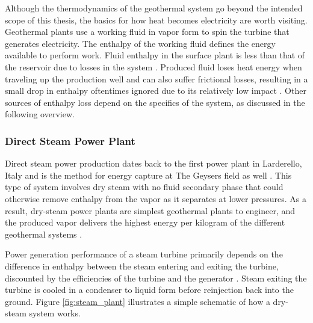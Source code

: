 Although the thermodynamics of the geothermal system go beyond the intended scope of this thesis, the basics for how heat becomes electricity are worth visiting. Geothermal plants use a working fluid in vapor form to spin the turbine that generates electricity. The enthalpy of the working fluid defines the energy available to perform work. Fluid enthalpy in the surface plant is less than that of the reservoir due to losses in the system \citep[p.\ 204]{glassley_geothermal_2015}. Produced fluid loses heat energy when traveling up the production well and can also suffer frictional losses, resulting in a small drop in enthalpy oftentimes ignored due to its relatively low impact \citep[p.\ 204]{glassley_geothermal_2015}. Other sources of enthalpy loss depend on the specifics of the system, as discussed in the following overview.

\subsubsection{Direct Steam Power Plant}\label{ch2:steam_plant}
Direct steam power production dates back to the first power plant in Larderello, Italy and is the method for energy capture at The Geysers field as well \citep[p.\ 131-132]{dipippo_geothermal_2012}. This type of system involves dry steam with no fluid secondary phase that could otherwise remove enthalpy from the vapor as it separates at lower pressures. As a result, dry-steam power plants are simplest geothermal plants to engineer, and the produced vapor delivers the highest energy per kilogram of the different geothermal systems \citep[p.\ 205]{glassley_geothermal_2015}.  

Power generation performance of a steam turbine primarily depends on the difference in enthalpy between the steam entering and exiting the turbine, discounted by the efficiencies of the turbine \citep[generally >85\%,][p. 206]{glassley_geothermal_2015} and the generator \citep[$\approx$98\%,][p.\ 116]{augustine_hydrothermal_2009}. Steam exiting the turbine is cooled in a condenser to liquid form before reinjection back into the ground. Figure \ref{fig:steam_plant} illustrates a simple schematic of how a dry-steam system works.

